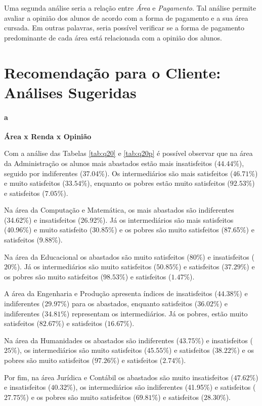 \documentclass[10pt,a4paper,oneside]{article}
\newcommand{\adm}{Administração\xspace}
\newcommand{\comp}{Computação e Matemática\xspace}
\newcommand{\edu}{Educacional\xspace}
\newcommand{\eng}{Engenharia e Produção\xspace}
\newcommand{\hum}{Humanidades\xspace}
\newcommand{\jur}{Jurídica e Contábil\xspace}
\begin{document}
Uma segunda análise seria a relação entre \textit{Área} e \textit{Pagamento}. Tal análise permite avaliar a opinião dos alunos de acordo com a forma de pagamento e a sua área cursada. Em outras palavras, seria 
possível verificar se a forma de pagamento predominante de cada área está relacionada com a opinião dos alunos.

\FloatBarrier
\section{Recomendação para o Cliente: Análises Sugeridas}
\label{section:analises}

\paragraph{a}{\textbf{Área x Renda x Opinião}}

Com a análise das Tabelas \ref{tab:q20} e \ref{tab:q20p} é possível observar que na área da \adm os alunos mais abastados estão mais insatisfeitos ($44.44\%$), seguido por 
indiferentes (37.04\%). Os intermediários são mais satisfeitos ($46.71\%$) e muito satisfeitos ($33.54\%$), enquanto os pobres estão muito satisfeitos ($92.53\%$) e satisfeitos ($7.05\%$).




Na área da \comp, os mais abastados são indiferentes (34.62\%) e insatisfeitos (26.92\%). Já os intermediários são mais satisfeitos (40.96\%) e muito satisfeito (30.85\%) e 
os pobres são muito satisfeitos (87.65\%) e satisfeitos (9.88\%).

Na área da \edu os abastados são muito satisfeitos ($80\%$) e insatisfeitos ($20\%$). Já os intermediários são muito satisfeitos ($50.85\%$) e satisfeitos ($37.29\%$) e os pobres são muito 
satisfeitos ($98.53\%$) e satisfeitos ($1.47\%$).

A área da \eng apresenta índices de insatisfeitos ($44.38\%$) e indiferentes ($29.97\%$) para os abastados, enquanto satisfeitos ($36.02\%$) e indiferentes ($34.81\%$) representam os intermediários.
Já os pobres, estão muito satisfeitos ($82.67\%$) e satisfeitos ($16.67\%$).

Na área da \hum os abastados são indiferentes ($43.75\%$) e insatisfeitos ($25\%$), os intermediários são muito satisfeitos ($45.55\%$) e satisfeitos ($38.22\%$) e os pobres são muito 
satisfeitos ($97.26\%$) e satisfeitos ($2.74\%$).

Por fim, na área \jur os abastados são muito insatisfeitos ($47.62\%$) e insatisfeitos ($40.32\%$), os intermediários são indiferentes (41.95\%) e satisfeitos ($27.75\%$) e os 
pobres são muito satisfeitos ($69.81\%$) e satisfeitos ($28.30\%$).
\end{document}
